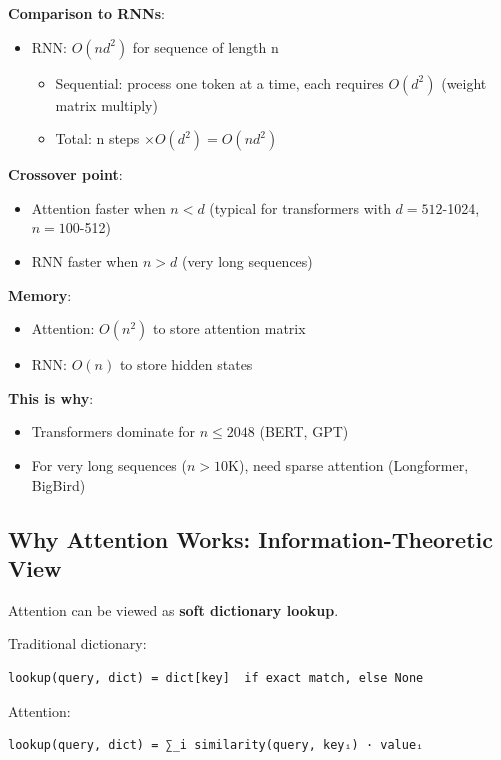 \documentclass[11pt,oneside]{book}
\begin{document}
\textbf{Comparison to RNNs}:
\begin{itemize}
\item RNN: $O(nd^2)$ for sequence of length n
\begin{itemize}
\item Sequential: process one token at a time, each requires $O(d^2)$ (weight matrix multiply)
\item Total: n steps $\times O(d^2) = O(nd^2)$
\end{itemize}
\end{itemize}

\textbf{Crossover point}:
\begin{itemize}
\item Attention faster when $n < d$ (typical for transformers with $d=512$-1024, $n=100$-512)
\item RNN faster when $n > d$ (very long sequences)
\end{itemize}

\textbf{Memory}:
\begin{itemize}
\item Attention: $O(n^2)$ to store attention matrix
\item RNN: $O(n)$ to store hidden states
\end{itemize}

\textbf{This is why}:
\begin{itemize}
\item Transformers dominate for $n \leq 2048$ (BERT, GPT)
\item For very long sequences ($n > 10$K), need sparse attention (Longformer, BigBird)
\end{itemize}

\subsection{Why Attention Works: Information-Theoretic View}

Attention can be viewed as \textbf{soft dictionary lookup}.

Traditional dictionary:
\begin{verbatim}
lookup(query, dict) = dict[key]  if exact match, else None
\end{verbatim}

Attention:
\begin{verbatim}
lookup(query, dict) = ∑_i similarity(query, keyᵢ) · valueᵢ
\end{verbatim}
\end{document}
